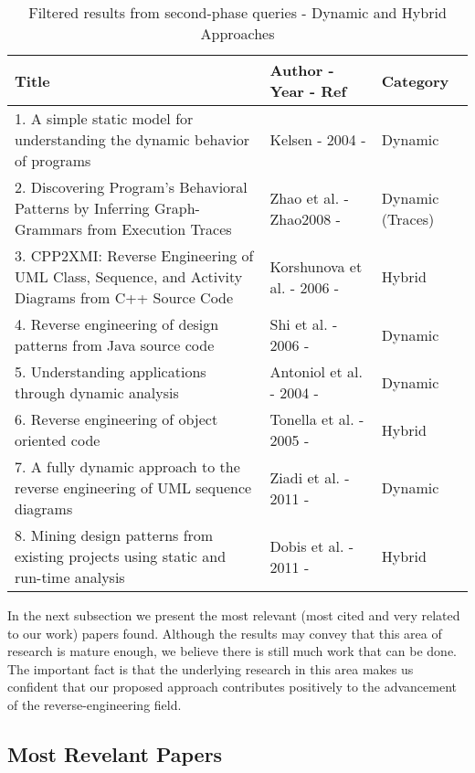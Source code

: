 \begin{table}[ht]
\caption{Filtered results from second-phase queries - Dynamic and Hybrid Approaches}
\label{table:relatedPapers2}
\centering
\begin{tabularx}{\textwidth}{X|X|l}
\toprule
\rowcolor[HTML]{BBDAFF}
\textbf{Title}  & \textbf{Author - Year - Ref} & \textbf{Category} \\ \hline
1. A simple static model for understanding the dynamic behavior of programs & Kelsen - 2004 - \cite{Kelsen2004} & Dynamic 
\\ \hline
2. Discovering Program's Behavioral Patterns by Inferring Graph-Grammars from Execution Traces &  Zhao et al. - Zhao2008 - \cite{Zhao2008}& Dynamic (Traces)
\\ \hline
3. CPP2XMI: Reverse Engineering of UML Class, Sequence, and Activity Diagrams from C++ Source Code & Korshunova et al. - 2006 - \cite{cpp2xmi} & Hybrid
\\ \hline
4. Reverse engineering of design patterns from Java source code & Shi et al. - 2006 - \cite{4019568} & Dynamic
\\ \hline
5. Understanding applications through dynamic analysis & Antoniol et al. - 2004 - \cite{Penta2004Web} & Dynamic \\ \hline
6. Reverse engineering of object oriented code & Tonella et al. - 2005 - \cite{1553682} & Hybrid
 \\ \hline
7. A fully dynamic approach to the reverse engineering of UML sequence diagrams & Ziadi et al. -  2011 - \cite{5773385} & Dynamic
\\ \hline
8. Mining design patterns from existing projects using static and run-time analysis & Dobis et al. - 2011 - \cite{Huzar2011} & Hybrid
\\ \hline
\end{tabularx}
\end{table}

In the next subsection we present the most relevant (most cited and very related to our work) papers found. 
Although the results may convey that this area of research is mature enough, we believe there is still much work that can be done. The important fact is that the underlying research in this area makes us confident that our proposed approach contributes positively to the advancement of the reverse-engineering field.

\subsection{Most Revelant Papers}

